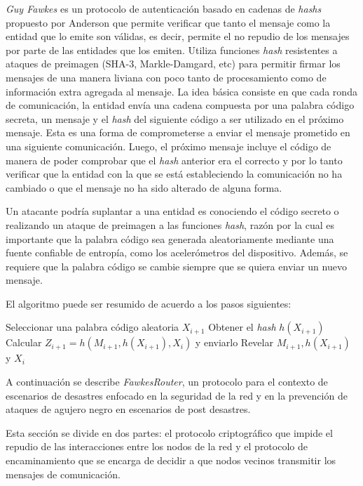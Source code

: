 \textit{Guy Fawkes} es un protocolo de autenticación basado en cadenas de
\textit{hashs} propuesto por Anderson
\cite{DBLP:journals/sigops/AndersonBCLMN98} que permite verificar que tanto el
mensaje como la entidad que lo emite son válidas, es decir, permite el no
repudio de los mensajes por parte de las entidades que los emiten. Utiliza funciones
\textit{hash} resistentes a ataques de preimagen (SHA-3, Markle-Damgard, etc)
para permitir firmar los mensajes de una manera liviana con poco \overhead{}
tanto de procesamiento como de información extra agregada al mensaje. La idea
básica consiste en que cada ronda de comunicación, la entidad envía una cadena
compuesta por una palabra código secreta, un mensaje y el \textit{hash} del
siguiente código a ser utilizado en el próximo mensaje. Esta es una forma de
comprometerse a enviar el mensaje prometido en una siguiente comunicación.
Luego, el próximo mensaje incluye el código de manera de poder comprobar que el
\textit{hash} anterior era el correcto y por lo tanto verificar que la entidad
con la que se está estableciendo la comunicación no ha cambiado o que el mensaje
no ha sido alterado de alguna forma. 

Un atacante podría suplantar a una entidad es conociendo el código secreto o
realizando un ataque de preimagen a las funciones \textit{hash}, razón por la
cual es importante que la palabra código sea generada aleatoriamente mediante
una fuente confiable de entropía, como los acelerómetros del dispositivo.
Además, se requiere que la palabra código se cambie siempre que se quiera enviar
un nuevo mensaje.

El algoritmo puede ser resumido de acuerdo a los pasos siguientes:


\begin{algorithm}[H]
  Seleccionar una palabra código aleatoria $X_{i + 1}$\;
  Obtener el \textit{hash} $h(X_{i + 1})$\;
  Calcular $Z_{i + 1} = h(M_{i + 1}, h(X_{i + 1}), X_i)$ y enviarlo\;
  Revelar $M_{i + 1}, h(X_{i + 1})$ y $X_i$\;
\end{algorithm}


\newpage
{}

A continuación se describe \textit{FawkesRouter}, un protocolo para el contexto
de escenarios de desastres enfocado en la seguridad de la red y en la prevención
de ataques de agujero negro en escenarios de post desastres. 

Esta sección se divide en dos partes: el protocolo criptográfico que impide el
repudio de las interacciones entre los nodos de la red y el protocolo de
encaminamiento que se encarga de decidir a que nodos vecinos transmitir los
mensajes de comunicación.


